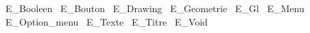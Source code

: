 E\_Booleen				\
E\_Bouton				\
E\_Drawing				\
E\_Geometrie				\
E\_Gl				\
E\_Menu				
E\_Option\_menu				\
E\_Texte					\
E\_Titre					\
E\_Void					\
